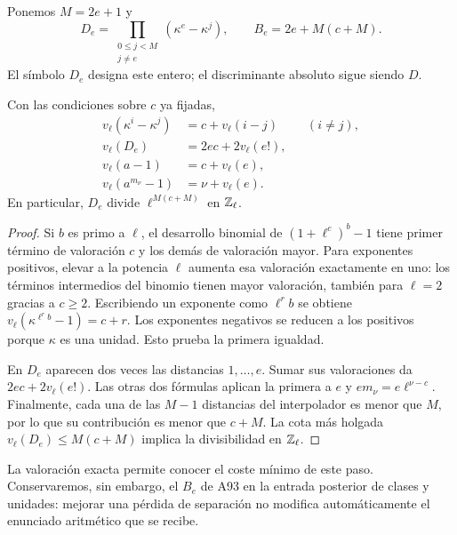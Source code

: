 Ponemos $M=2e+1$ y
\begin{equation}
 D_e=\prod_{\substack{0\le j<M\\j\ne e}}
 (\kappa^e-\kappa^j),\qquad
 B_e=2e+M(c+M).
 \label{eq:cf-interpolador}
\end{equation}
El símbolo $D_e$ designa este entero; el discriminante absoluto
sigue siendo $D$.

\begin{lema}
\label{lem:cf-valuaciones}
Con las condiciones sobre $c$ ya fijadas,
\begin{equation}
 \begin{aligned}
 v_\ell(\kappa^i-\kappa^j)&=c+v_\ell(i-j) &&(i\ne j),\\
 v_\ell(D_e)&=2ec+2v_\ell(e!),\\
 v_\ell(a-1)&=c+v_\ell(e),\\
 v_\ell(a^{m_\nu}-1)&=\nu+v_\ell(e).
 \end{aligned}
 \label{eq:cf-valuaciones}
\end{equation}
En particular, $D_e$ divide $\ell^{M(c+M)}$ en $\mathbb{Z}_\ell$.
\end{lema}

\begin{proof}
Si $b$ es primo a $\ell$, el desarrollo binomial de
$(1+\ell^c)^b-1$ tiene primer término de valoración $c$ y
los demás de valoración mayor. Para exponentes positivos,
elevar a la potencia $\ell$ aumenta esa valoración exactamente
en uno: los términos intermedios del binomio tienen mayor
valoración, también para $\ell=2$ gracias a $c\ge2$.
Escribiendo un exponente como $\ell^rb$ se obtiene
$v_\ell(\kappa^{\ell^rb}-1)=c+r$.
Los exponentes negativos se reducen a los positivos porque
$\kappa$ es una unidad. Esto prueba la primera igualdad.

En $D_e$ aparecen dos veces las distancias $1,\ldots,e$.
Sumar sus valoraciones da $2ec+2v_\ell(e!)$.
Las otras dos fórmulas aplican la primera a $e$ y
$em_\nu=e\ell^{\nu-c}$. Finalmente, cada una de las $M-1$
distancias del interpolador es menor que $M$, por lo que su
contribución es menor que $c+M$. La cota más holgada
$v_\ell(D_e)\le M(c+M)$ implica la divisibilidad en $\mathbb{Z}_\ell$.
\end{proof}

La valoración exacta permite conocer el coste mínimo de este paso.
Conservaremos, sin embargo, el $B_e$ de A93 en la entrada posterior
de clases y unidades: mejorar una pérdida de separación no
modifica automáticamente el enunciado aritmético que se recibe.

